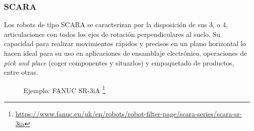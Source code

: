 \subsubsection{SCARA}
\label{sec:scara}
Los robots de tipo \acs{SCARA} se caracterizan por la disposición de sus 3, o 4, articulaciones con todos los ejes de rotación perpendiculares al suelo. Su capacidad para 
realizar movimientos rápidos y precisos en un plano horizontal lo hacen ideal para su uso en aplicaciones de ensamblaje electrónico, operaciones de 
\textit{pick and place} (coger componentes y situarlos) y empaquetado de productos, entre otras.
\begin{figure} [h!]
  \centering    
  \hspace{3cm}
  \caption[Fanuc SR-3iA]{Ejemplo: FANUC SR-3iA \footnote{\url{https://www.fanuc.eu/uk/en/robots/robot-filter-page/scara-series/scara-sr-3ia}}}
\end{figure}

